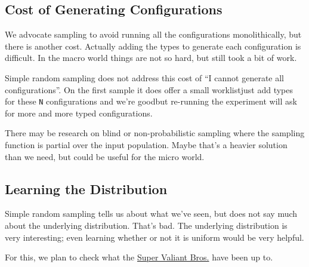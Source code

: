 \documentclass{article}
\begin{document}
\subsection{Cost of Generating Configurations}
We advocate sampling to avoid running all the configurations monolithically, but there is another cost.
Actually adding the types to generate each configuration is difficult.
In the macro world things are not so hard, but still took a bit of work.

Simple random sampling does not address this cost of ``I cannot generate all configurations''.
On the first sample it does offer a small worklist\textemdash just add types for these \texttt{N} configurations and we're good\textemdash but re-running the experiment will ask for more and more typed configurations.

There may be research on blind or non-probabilistic sampling where the sampling function is partial over the input population.
Maybe that's a heavier solution than we need, but could be useful for the micro world.


\subsection{Learning the Distribution}
Simple random sampling tells us about what we've seen, but does not say much about the underlying distribution.
That's bad.
The underlying distribution is very interesting; even learning whether or not it is uniform would be very helpful.

For this, we plan to check what the \href{http://theory.stanford.edu/~valiant/papers/instanceOptFull.pdf}{Super Valiant Bros.} have been up to.
\end{document}
